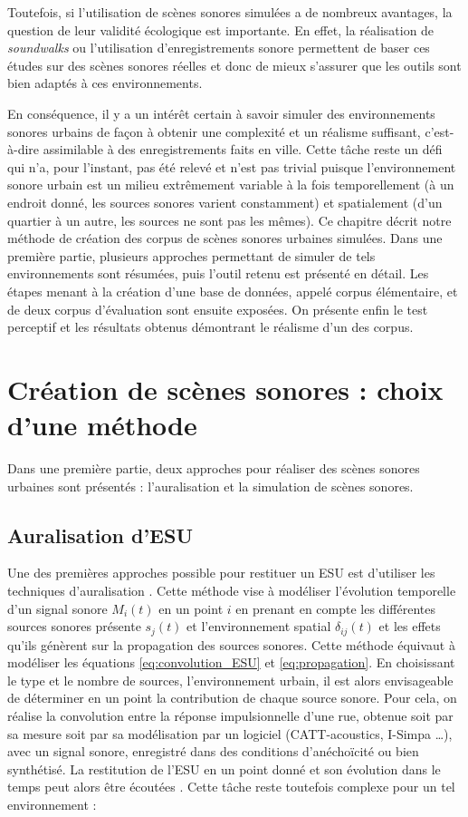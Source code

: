 Toutefois, si l'utilisation de scènes sonores simulées a de nombreux avantages, la question de leur validité écologique est importante. En effet, la réalisation de \textit{soundwalks} ou l'utilisation d'enregistrements sonore permettent de baser ces études sur des scènes sonores réelles et donc de mieux s'assurer que les outils sont bien adaptés à ces environnements.

En conséquence, il y a un intérêt certain à savoir simuler des environnements sonores urbains de façon à obtenir une complexité et un réalisme suffisant, c'est-à-dire assimilable à des enregistrements faits en ville. Cette tâche reste un défi qui n'a, pour l'instant, pas été relevé et n'est pas trivial puisque l'environnement sonore urbain est un milieu extrêmement variable à la fois temporellement (à un endroit donné, les sources sonores varient constamment) et spatialement (d'un quartier à un autre, les sources ne sont pas les mêmes).
Ce chapitre décrit notre méthode de création des corpus de scènes sonores urbaines simulées. Dans une première partie, plusieurs approches permettant de simuler de tels environnements sont résumées, puis l'outil retenu est présenté en détail. Les étapes menant à la création d'une base de données, appelé corpus élémentaire, et de deux corpus d'évaluation sont ensuite exposées. On présente enfin le test perceptif et les résultats obtenus démontrant le réalisme d'un des corpus.

\section{Création de scènes sonores : choix d'une méthode}

Dans une première partie, deux approches pour réaliser des scènes sonores urbaines sont présentés : l'auralisation et la simulation de scènes sonores.

\subsection{Auralisation d'ESU}

Une des premières approches possible pour restituer un ESU est d'utiliser les techniques d'auralisation \cite{forssen2009auralization}. Cette méthode vise à modéliser l'évolution temporelle d'un signal sonore $M_i(t)$ en un point $i$ en prenant en compte les différentes sources sonores présente $s_j(t)$ et l'environnement spatial $\delta_{ij}(t)$ et les effets qu'ils génèrent sur la propagation des sources sonores. Cette méthode équivaut à modéliser les équations \ref{eq:convolution_ESU} et \ref{eq:propagation}. En choisissant le type et le nombre de sources, l'environnement urbain, il est alors envisageable de déterminer en un point la contribution de chaque source sonore.
Pour cela, on réalise la convolution entre la réponse impulsionnelle d'une rue, obtenue soit par sa mesure soit par sa modélisation par un logiciel (CATT-acoustics, I-Simpa \dots), avec un signal sonore, enregistré dans des conditions d'anéchoïcité ou bien synthétisé. La restitution de l'ESU en un point donné et son évolution dans le temps peut alors être écoutées \cite{vorlander2007auralization}. Cette tâche reste toutefois complexe pour un tel environnement :

